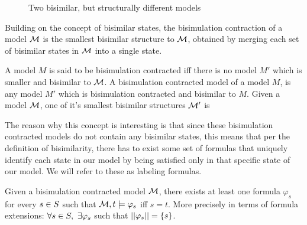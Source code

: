 \begin{figure}[h]
	\label{fig:bisimmods}
	\centering
	\caption{Two bisimilar, but structurally different models}
\end{figure}

Building on the concept of bisimilar states, the bisimulation contraction of a model $\mathcal{M}$ is the smallest bisimilar structure to $\mathcal{M}$, obtained by merging each set of bisimilar states in $\mathcal{M}$ into a single state. 

\begin{definition}
	\label{def:bisimContract}
	A model $M$ is said to be bisimulation contracted iff there is no model $M'$ which is smaller and bisimilar to $\mathcal{M}$. A bisimulation contracted model of a model $M$, is any model $M'$ which is bisimulation contracted and bisimilar to $M$.
	Given a model $\mathcal{M}$, one of it's smallest bisimilar structures $\mathcal{M}'$ is 
\end{definition}

The reason why this concept is interesting is that since these bisimulation contracted models do not contain any bisimilar states, this means that per the definition of bisimilarity, there has to exist some set of formulas that uniquely identify each state in our model by being satisfied only in that specific state of our model. We will refer to these as labeling formulas.

\begin{definition}
	\label{def:label}
	Given a bisimulation contracted model $\mathcal{M}$, there exists at least one formula $\varphi_s$ for every $s\in S$ such that $\mathcal{M},t \models \varphi_s$ iff $s = t$. More precisely in terms of formula extensions: 
	\centering
	$\forall s\in S,~\exists\varphi_s$ such that $||\varphi_s|| = \{s\}$.
\end{definition}

